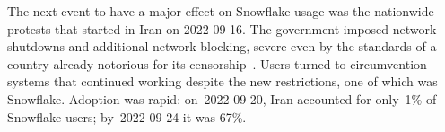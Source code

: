 \documentclass[letterpaper,twocolumn]{article}
\begin{document}
The next event to have a major effect on Snowflake usage
was the nationwide protests that started in Iran on \mbox{2022-09-16}.
The government imposed network shutdowns
and additional network blocking,
severe even by the standards of a country already notorious
for its censorship~\cite{ooni-2022-iran-blocks-social-media-mahsa-amini-protests}.
Users turned to circumvention systems
that continued working despite the new restrictions,
one of which was Snowflake.
Adoption was rapid:
on~\mbox{2022-09-20}, Iran accounted for only~1\% of Snowflake users;
by~\mbox{2022-09-24} it was 67\%.
\end{document}
